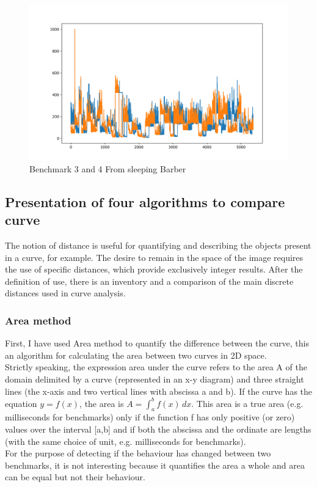\documentclass{article}
\begin{document}
\begin{figure}[h!]
    \centering
    \includegraphics[width=1\textwidth]{plot_1.png}
    \caption{Benchmark 3 and 4 From sleeping Barber}
    \label{fig:bench_2_3}
\end{figure}

\subsection{Presentation of four algorithms to compare curve}

The notion of distance is useful for quantifying and describing the objects present in
a curve, for example. The desire to remain in the space of the image requires the use of specific distances, which provide exclusively integer results. After the definition of use, there is an inventory and a comparison of the main discrete distances used in curve analysis.

\subsubsection{Area method}

First, I have used Area \citep{jekel2019similarity} method to quantify the difference between the curve, this an algorithm for calculating the area between two curves in 2D space.\\
Strictly speaking, the expression area under the curve refers to the area A of the domain delimited by a curve (represented in an x-y diagram) and three straight lines (the x-axis and two vertical lines with abscissa a and b). If the curve has the equation $y=f(x)$, the area is $A=\int _{a}^{b}f(x)\, {d} x$. This area is a true area (e.g. milliseconds for benchmarks) only if the function f has only positive (or zero) values over the interval [a,b] and if both the abscissa and the ordinate are lengths (with the same choice of unit, e.g. milliseconds for benchmarks).\\
For the purpose of detecting if the behaviour has changed between two benchmarks, it is not interesting because it quantifies the area a whole and area can be equal but not their behaviour.
\end{document}
